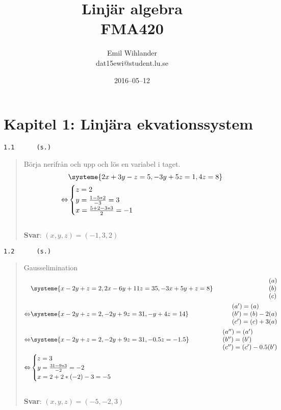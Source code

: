 \documentclass[a4paper]{article}
\title{Linjär algebra\\ FMA420}
\author{Emil Wihlander\\ dat15ewi@student.lu.se}
\date{2016--05--12}
\newcommand{\tskcol}[1]{\textcolor{tskcol}{#1}}
\begin{document}
 
\maketitle
\pagebreak
\section*{Kapitel 1: Linjära ekvationssystem}
\texttt{\tskcol{1.1~~~~~ (s.)}}
\begin{quotation}
	\noindent
	Börja nerifrån och upp och lös en variabel i taget.
	\begin{align*}
	&\systeme{
		2x+3y- z=5,
		  -3y+5z=1,
		      4z=8}  \\ \Leftrightarrow
	&\begin{cases}
	z=2 \\
	y=\frac{1-5*2}{-3}=3 \\
	x=\frac{5+2-3*3}{2}=-1
	\end{cases}
	\end{align*}
	\\
	\textbf{Svar}: $(x,y,z)=(-1,3,2)$
\end{quotation}

\texttt{\tskcol{1.2~~~~~ (s.)}}
\begin{quotation}
	\noindent
	Gausselimination
	\begin{align*}
	&\systeme{
		  x-2y+  z=2,
		 2x-6y+11z=35,
		-3x+5y+  z=8}  
	&\begin{array}{l} 
		(a) \\ 
		(b) \\
		(c)
	\end{array} \\ \Leftrightarrow
	&\systeme{
		x-2y+ z=2,
		 -2y+9z=31,
		 - y+4z=14}  
	&\begin{array}{l} 
	(a')=(a) \\ 
	(b')=(b)-2(a) \\
	(c')=(c)+3(a)
	\end{array} \\ \Leftrightarrow
	&\systeme{
		x-2y+   z=2,
		 -2y+  9z=31,
		    -0.5z=-1.5}  
	&\begin{array}{l} 
	(a'')=(a') \\ 
	(b'')=(b') \\
	(c'')=(c')-0.5(b')
	\end{array} \\ \Leftrightarrow
	&\begin{cases}
	z=3 \\
	y=\frac{31-9*3}{-2} =-2\\
	x=2+2*(-2)-3=-5
	\end{cases}
	\end{align*}
	\\
	\textbf{Svar}: $(x,y,z)=(-5,-2,3)$
\end{quotation}
\end{document}
